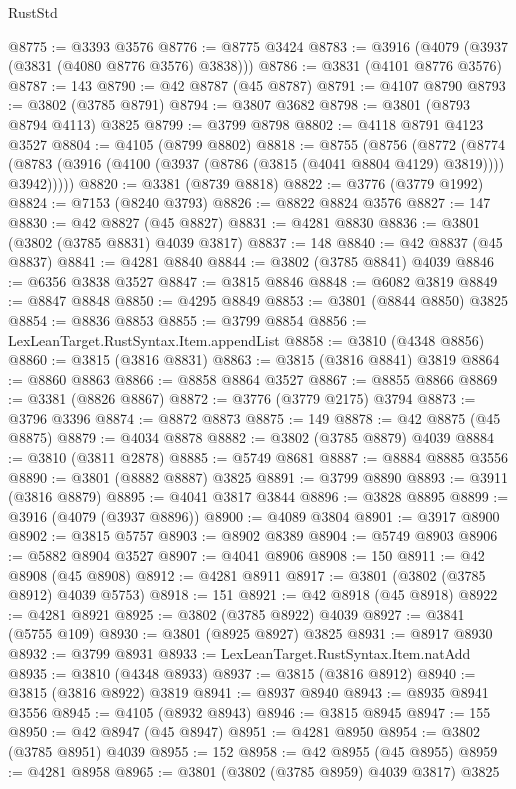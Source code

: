 \begin{lexlean}{RustStd}
\begin{coremodule}
@8775 := @3393 @3576
@8776 := @8775 @3424
@8783 := @3916 (@4079 (@3937 (@3831 (@4080 @8776 @3576) @3838)))
@8786 := @3831 (@4101 @8776 @3576)
@8787 := 143
@8790 := @42 @8787 (@45 @8787)
@8791 := @4107 @8790
@8793 := @3802 (@3785 @8791)
@8794 := @3807 @3682
@8798 := @3801 (@8793 @8794 @4113) @3825
@8799 := @3799 @8798
@8802 := @4118 @8791 @4123 @3527
@8804 := @4105 (@8799 @8802)
@8818 := @8755
    (@8756
      (@8772
        (@8774 (@8783 (@3916 (@4100 (@3937 (@8786 (@3815 (@4041 @8804 @4129) @3819)))) @3942)))))
@8820 := @3381 (@8739 @8818)
@8822 := @3776 (@3779 @1992)
@8824 := @7153 (@8240 @3793)
@8826 := @8822 @8824 @3576
@8827 := 147
@8830 := @42 @8827 (@45 @8827)
@8831 := @4281 @8830
@8836 := @3801 (@3802 (@3785 @8831) @4039 @3817)
@8837 := 148
@8840 := @42 @8837 (@45 @8837)
@8841 := @4281 @8840
@8844 := @3802 (@3785 @8841) @4039
@8846 := @6356 @3838 @3527
@8847 := @3815 @8846
@8848 := @6082 @3819
@8849 := @8847 @8848
@8850 := @4295 @8849
@8853 := @3801 (@8844 @8850) @3825
@8854 := @8836 @8853
@8855 := @3799 @8854
@8856 := LexLeanTarget.RustSyntax.Item.appendList
@8858 := @3810 (@4348 @8856)
@8860 := @3815 (@3816 @8831)
@8863 := @3815 (@3816 @8841) @3819
@8864 := @8860 @8863
@8866 := @8858 @8864 @3527
@8867 := @8855 @8866
@8869 := @3381 (@8826 @8867)
@8872 := @3776 (@3779 @2175) @3794
@8873 := @3796 @3396
@8874 := @8872 @8873
@8875 := 149
@8878 := @42 @8875 (@45 @8875)
@8879 := @4034 @8878
@8882 := @3802 (@3785 @8879) @4039
@8884 := @3810 (@3811 @2878)
@8885 := @5749 @8681
@8887 := @8884 @8885 @3556
@8890 := @3801 (@8882 @8887) @3825
@8891 := @3799 @8890
@8893 := @3911 (@3816 @8879)
@8895 := @4041 @3817 @3844
@8896 := @3828 @8895
@8899 := @3916 (@4079 (@3937 @8896))
@8900 := @4089 @3804
@8901 := @3917 @8900
@8902 := @3815 @5757
@8903 := @8902 @8389
@8904 := @5749 @8903
@8906 := @5882 @8904 @3527
@8907 := @4041 @8906
@8908 := 150
@8911 := @42 @8908 (@45 @8908)
@8912 := @4281 @8911
@8917 := @3801 (@3802 (@3785 @8912) @4039 @5753)
@8918 := 151
@8921 := @42 @8918 (@45 @8918)
@8922 := @4281 @8921
@8925 := @3802 (@3785 @8922) @4039
@8927 := @3841 (@5755 @109)
@8930 := @3801 (@8925 @8927) @3825
@8931 := @8917 @8930
@8932 := @3799 @8931
@8933 := LexLeanTarget.RustSyntax.Item.natAdd
@8935 := @3810 (@4348 @8933)
@8937 := @3815 (@3816 @8912)
@8940 := @3815 (@3816 @8922) @3819
@8941 := @8937 @8940
@8943 := @8935 @8941 @3556
@8945 := @4105 (@8932 @8943)
@8946 := @3815 @8945
@8947 := 155
@8950 := @42 @8947 (@45 @8947)
@8951 := @4281 @8950
@8954 := @3802 (@3785 @8951) @4039
@8955 := 152
@8958 := @42 @8955 (@45 @8955)
@8959 := @4281 @8958
@8965 := @3801 (@3802 (@3785 @8959) @4039 @3817) @3825

\end{coremodule}
\end{lexlean}
